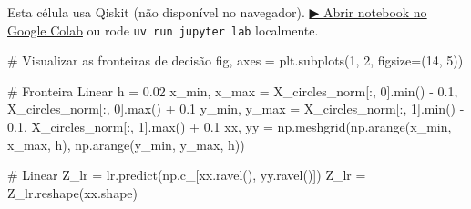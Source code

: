 \documentclass[
  brazilian,
]{report}
\newenvironment{Shaded}{\begin{snugshade}}{\end{snugshade}}
\newcommand{\BuiltInTok}[1]{\textcolor[rgb]{0.00,0.23,0.31}{#1}}
\newcommand{\CommentTok}[1]{\textcolor[rgb]{0.37,0.37,0.37}{#1}}
\newcommand{\DecValTok}[1]{\textcolor[rgb]{0.68,0.00,0.00}{#1}}
\newcommand{\FloatTok}[1]{\textcolor[rgb]{0.68,0.00,0.00}{#1}}
\newcommand{\NormalTok}[1]{\textcolor[rgb]{0.00,0.23,0.31}{#1}}
\newcommand{\OperatorTok}[1]{\textcolor[rgb]{0.37,0.37,0.37}{#1}}
\begin{document}
\begin{tcolorbox}[enhanced jigsaw, arc=.35mm, bottomrule=.15mm, bottomtitle=1mm, breakable, colback=white, colbacktitle=quarto-callout-warning-color!10!white, colframe=quarto-callout-warning-color-frame, coltitle=black, left=2mm, leftrule=.75mm, opacityback=0, opacitybacktitle=0.6, rightrule=.15mm, title=\textcolor{quarto-callout-warning-color}{\faExclamationTriangle}\hspace{0.5em}{⚛️ Célula Qiskit --- execute no Colab ou localmente}, titlerule=0mm, toprule=.15mm, toptitle=1mm]

Esta célula usa Qiskit (não disponível no navegador).
\href{https://colab.research.google.com/github/maxwellamaral/aula-quantum/blob/main/notebooks/20-quantum-machine-learning.ipynb}{▶
Abrir notebook no Google Colab} ou rode \texttt{uv\ run\ jupyter\ lab}
localmente.

\begin{Shaded}
\begin{Highlighting}[]

\CommentTok{\# Visualizar as fronteiras de decisão}
\NormalTok{fig, axes }\OperatorTok{=}\NormalTok{ plt.subplots(}\DecValTok{1}\NormalTok{, }\DecValTok{2}\NormalTok{, figsize}\OperatorTok{=}\NormalTok{(}\DecValTok{14}\NormalTok{, }\DecValTok{5}\NormalTok{))}

\CommentTok{\# Fronteira Linear}
\NormalTok{h }\OperatorTok{=} \FloatTok{0.02}
\NormalTok{x\_min, x\_max }\OperatorTok{=}\NormalTok{ X\_circles\_norm[:, }\DecValTok{0}\NormalTok{].}\BuiltInTok{min}\NormalTok{() }\OperatorTok{{-}} \FloatTok{0.1}\NormalTok{, X\_circles\_norm[:, }\DecValTok{0}\NormalTok{].}\BuiltInTok{max}\NormalTok{() }\OperatorTok{+} \FloatTok{0.1}
\NormalTok{y\_min, y\_max }\OperatorTok{=}\NormalTok{ X\_circles\_norm[:, }\DecValTok{1}\NormalTok{].}\BuiltInTok{min}\NormalTok{() }\OperatorTok{{-}} \FloatTok{0.1}\NormalTok{, X\_circles\_norm[:, }\DecValTok{1}\NormalTok{].}\BuiltInTok{max}\NormalTok{() }\OperatorTok{+} \FloatTok{0.1}
\NormalTok{xx, yy }\OperatorTok{=}\NormalTok{ np.meshgrid(np.arange(x\_min, x\_max, h), np.arange(y\_min, y\_max, h))}

\CommentTok{\# Linear}
\NormalTok{Z\_lr }\OperatorTok{=}\NormalTok{ lr.predict(np.c\_[xx.ravel(), yy.ravel()])}
\NormalTok{Z\_lr }\OperatorTok{=}\NormalTok{ Z\_lr.reshape(xx.shape)}


\end{Highlighting}
\end{Shaded}
\end{tcolorbox}
\end{document}
